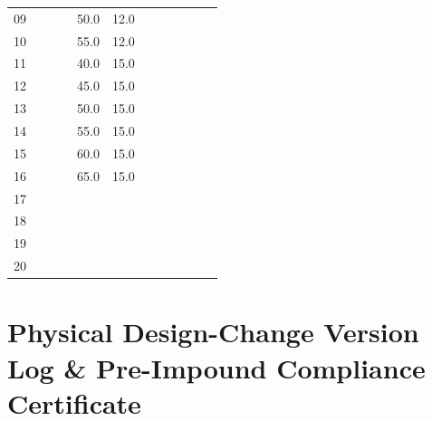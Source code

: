 {\begin{tabularx}{\linewidth}{@{}c c c c c c c c c c c >{\raggedright\arraybackslash}X@{}}
09 & \dotfill & \dotfill & \dotfill & 50.0 & 12.0 & \dotfill & \dotfill & \dotfill & \dotfill & \dotfill & \dotfill \\
\rowcolor{rowalt}10 & \dotfill & \dotfill & \dotfill & 55.0 & 12.0 & \dotfill & \dotfill & \dotfill & \dotfill & \dotfill & \dotfill \\
11 & \dotfill & \dotfill & \dotfill & 40.0 & 15.0 & \dotfill & \dotfill & \dotfill & \dotfill & \dotfill & \dotfill \\
\rowcolor{rowalt}12 & \dotfill & \dotfill & \dotfill & 45.0 & 15.0 & \dotfill & \dotfill & \dotfill & \dotfill & \dotfill & \dotfill \\
13 & \dotfill & \dotfill & \dotfill & 50.0 & 15.0 & \dotfill & \dotfill & \dotfill & \dotfill & \dotfill & \dotfill \\
\rowcolor{rowalt}14 & \dotfill & \dotfill & \dotfill & 55.0 & 15.0 & \dotfill & \dotfill & \dotfill & \dotfill & \dotfill & \dotfill \\
15 & \dotfill & \dotfill & \dotfill & 60.0 & 15.0 & \dotfill & \dotfill & \dotfill & \dotfill & \dotfill & \dotfill \\
\rowcolor{rowalt}16 & \dotfill & \dotfill & \dotfill & 65.0 & 15.0 & \dotfill & \dotfill & \dotfill & \dotfill & \dotfill & \dotfill \\
17 & \dotfill & \dotfill & \dotfill & \dotfill & \dotfill & \dotfill & \dotfill & \dotfill & \dotfill & \dotfill & \dotfill \\
\rowcolor{rowalt}18 & \dotfill & \dotfill & \dotfill & \dotfill & \dotfill & \dotfill & \dotfill & \dotfill & \dotfill & \dotfill & \dotfill \\
19 & \dotfill & \dotfill & \dotfill & \dotfill & \dotfill & \dotfill & \dotfill & \dotfill & \dotfill & \dotfill & \dotfill \\
\rowcolor{rowalt}20 & \dotfill & \dotfill & \dotfill & \dotfill & \dotfill & \dotfill & \dotfill & \dotfill & \dotfill & \dotfill & \dotfill \\
\bottomrule
\end{tabularx}}

\clearpage
\section{Physical Design-Change Version Log \& Pre-Impound Compliance Certificate}\label{app:D.2}

